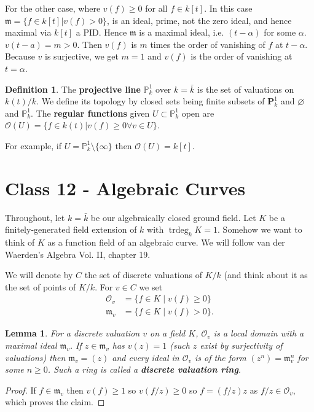 \documentclass{article}
\newcommand{\fr}{\mathfrak}
\DeclareMathOperator{\trdeg}{trdeg}
\theoremstyle{plain}
\newtheorem{lem}[thm]{Lemma}
\theoremstyle{definition}
\newtheorem{defn}{Definition}
\theoremstyle{remark}
\begin{document}
For the other case, where $v(f)\geq 0$ for all $f\in k[t]$. In this case
$\fr m=\{f\in k[t] | v(f)>0\}$, is an ideal, prime, not the zero ideal, and hence maximal via $k[t]$ a PID. Hence $\fr m$ is a maximal ideal, i.e. $(t-\alpha)$ for some $\alpha$. $v(t-a)=m>0$. Then $v(f)$ is $m$ times the order of vanishing of $f$ at $t-\alpha$. Because $v$ is surjective, we get $m=1$ and $v(f)$ is the order of vanishing at $t=\alpha$.

\begin{defn}
The \textbf{projective line} $\mathbb{P}_k^1$ over $k=\bar k$ is the set of valuations on $k(t)/k$. We define its topology by closed sets being finite subsets of $\mathbf{P}_k^1$ and $\varnothing$ and $\mathbb{P}_k^1$. The \textbf{regular functions} given $U\subset\mathbb{P}_k^1$ open are $\mathcal{O}(U)=\{f\in k(t) | v(f)\geq 0 \forall v\in U\}$.
\end{defn}

For example, if $U=\mathbb{P}_k^1\setminus\{\infty\}$ then $\mathcal{O}(U)=k[t]$.

\section*{Class 12 - Algebraic Curves}

Throughout, let $k=\bar k$ be our algebraically closed ground field. Let $K$ be a finitely-generated field extension of $k$ with $\trdeg_k K=1$. Somehow we want to think of $K$ as a function field of an algebraic curve. We will follow van der Waerden's Algebra Vol. II, chapter 19.

We will denote by $C$ the set of discrete valuations of $K/k$ (and think about it as the set of points of $K/k$. For $v\in C$ we set
\begin{align*}
\mathcal{O}_v&=\{f\in K \mid v(f)\geq 0\}\\
\fr m_v&= \{ f\in K \mid v(f)>0 \}.
\end{align*}

\begin{lem}
\label{L68}
For a discrete valuation $v$ on a field $K$, $\mathcal{O}_v$ is a local domain with a maximal ideal $\fr m_v$. If $z\in\fr m_v$ has $v(z)=1$ (such $z$ exist by surjectivity of valuations) then $\fr m_v=(z)$ and every ideal in $\mathcal{O}_v$ is of the form $(z^n)=\fr m_v^n$ for some $n\geq 0$. Such a ring is called a \textbf{discrete valuation ring}.
\end{lem}
\begin{proof}
If $f\in\fr m_v$ then $v(f)\geq 1$ so $v(f/z)\geq 0$ so $f=(f/z)z$ as $f/z\in\mathcal{O}_v$, which proves the claim.
\end{proof}
\end{document}
